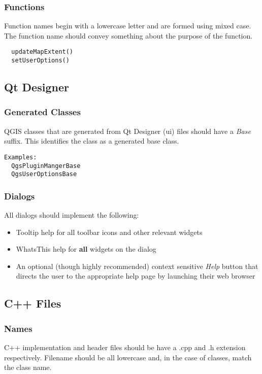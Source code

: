 \subsubsection{Functions}
Function names begin with a lowercase letter and are formed using mixed case.
The function name should convey something about the purpose of the function.

\begin{verbatim}
  updateMapExtent()
  setUserOptions()
\end{verbatim}

\subsection{Qt Designer}
\subsubsection{Generated Classes}
QGIS classes that are generated from Qt Designer (ui) files should have a
\textit{Base} suffix. This identifies the class as a generated base class.

\begin{verbatim}
Examples:
  QgsPluginMangerBase
  QgsUserOptionsBase
\end{verbatim}
\subsubsection{Dialogs}

All dialogs should implement the following:

\begin{itemize}
\item Tooltip help for all toolbar icons and other relevant widgets
\item WhatsThis help for \textbf{all} widgets on the dialog
\item An optional (though highly recommended) context sensitive \textit{Help}
button that directs the user to the appropriate help page by launching their web 
browser
\end{itemize}

\subsection{C++ Files}
\subsubsection{Names}
C++ implementation and header files should be have a .cpp and .h extension
respectively.  Filename should be all lowercase and, in the case of classes,
match the class name.

